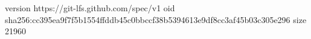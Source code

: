 version https://git-lfs.github.com/spec/v1
oid sha256:cc395ea9f7f5b1554ffddb45c0bbccf38b5394613e9df8cc3af45b03c305e296
size 21960
